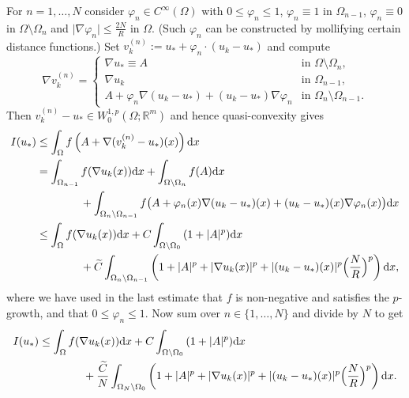 \begin{itemize}
\begin{itemize}
		For $n=1,\dotsc,N$ consider $\varphi_n\in C^\infty(\Omega)$ with $0\leq\varphi_n\leq 1$, $\varphi_n\equiv1$ in $\Omega_{n-1}$, $\varphi_n\equiv0$ in $\Omega\setminus\Omega_n$ and $\lvert\nabla\varphi_n\rvert\leq\frac{2N}{R}$ in $\Omega$. (Such $\varphi_n$ can be constructed by mollifying certain distance functions.) Set $v_k^{(n)}:=u_*+\varphi_n\cdot(u_k-u_*)$ and compute
		\[\nabla v_k^{(n)}=\left\{\begin{array}{rl}
			\nabla u_*\equiv A&\text{in }\Omega\setminus\Omega_n,\\
			\nabla u_k&\text{in }\Omega_{n-1},\\
			A+\varphi_n\nabla(u_k-u_*)+(u_k-u_*)\nabla\varphi_n&\text{in }\Omega_n\setminus\Omega_{n-1}.
		\end{array}\right.\]
		Then $v_k^{(n)}-u_*\in W_0^{1,p}(\Omega;\mathbb{R}^m)$ and hence quasi-convexity gives
		\begin{align*}
			I(u_*)&\leq\int_\Omega{f\left(A+\nabla(v_k^{(n)}-u_*)(x)\right)\mathrm{d}x}\\
			&=\int_{\Omega_{n-1}}{f(\nabla u_k(x))\mathrm{d}x}+\int_{\Omega\setminus\Omega_n}{f(A)\mathrm{d}x}\\
			&\qquad\qquad+\int_{\Omega_n\setminus\Omega_{n-1}}{f\bigl(A+\varphi_n(x)\nabla(u_k-u_*)(x)+(u_k-u_*)(x)\nabla\varphi_n(x)\bigr)\mathrm{d}x}\\
			&\leq\int_\Omega{f(\nabla u_k(x))\mathrm{d}x}+C\int_{\Omega\setminus\Omega_0}{(1+\lvert A\rvert^p)\mathrm{d}x}\\
			&\qquad\qquad+\widetilde{C}\int_{\Omega_n\setminus\Omega_{n-1}}{\left(1+\lvert A\rvert^p+\lvert\nabla u_k(x)\rvert^p+\lvert(u_k-u_*)(x)\rvert^p\Bigl(\frac{N}{R}\Bigr)^p\right)\mathrm{d}x},
		\end{align*}
		where we have used in the last estimate that $f$ is non-negative and satisfies the $p$-growth, and that $0\leq\varphi_n\leq 1$. Now sum over $n\in\{1,\dotsc,N\}$ and divide by $N$ to get
		\begin{align*}
			I(u_*)&\leq\int_\Omega{f(\nabla u_k(x))\mathrm{d}x}+C\int_{\Omega\setminus\Omega_0}{(1+\lvert A\rvert^p)\mathrm{d}x}\\
			&\qquad\qquad+\frac{\widetilde{C}}{N}\int_{\Omega_N\setminus\Omega_0}{\left(1+\lvert A\rvert^p+\lvert\nabla u_k(x)\rvert^p+\lvert(u_k-u_*)(x)\rvert^p\Bigl(\frac{N}{R}\Bigr)^p\right)\mathrm{d}x}.
		\end{align*}
	\end{itemize}
\end{itemize}